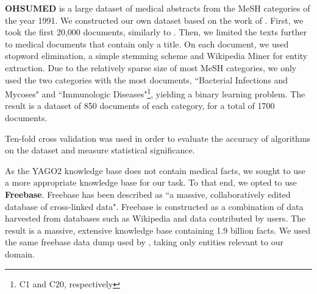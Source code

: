 \documentclass{article}
\theoremstyle{definition}
\begin{document}
\textbf{OHSUMED} is a large dataset of medical abstracts from the MeSH categories of the year 1991. 
We constructed our own dataset based on the work of \citep{joachims1998text}.
First, we took the first 20,000 documents, similarly to \cite{joachims1998text}.
Then, we limited the texts further to medical documents that contain only a title. On each document, we used stopword elimination, a simple stemming scheme %
and Wikipedia Miner \citep{milne2013open} for entity extraction. 
Due to the relatively sparse size of most MeSH categories, we only used the two categories with the most documents, ``Bacterial Infections and Mycoses" and ``Immunologic Diseases"\footnote{C1 and C20, respectively}, yielding a binary learning problem.
The result is a dataset of 850 documents of each category, for a total of 1700 documents.

Ten-fold cross validation was used in order to evaluate the accuracy of algorithms on the dataset and measure statistical significance.

As the YAGO2 knowledge base does not contain medical facts, we sought to use a more appropriate knowledge base for our task. To that end, we opted to use \textbf{Freebase}.
Freebase has been described as ``a massive, collaboratively edited database of cross-linked data". Freebase is constructed as a combination of data harvested from databases such as Wikipedia and data contributed by users. The result is a massive, extensive knowledge base containing 1.9 billion facts. 
We used the same freebase data dump used by \cite{bast2014easy}, taking only entities relevant to our domain. 


\end{document}
